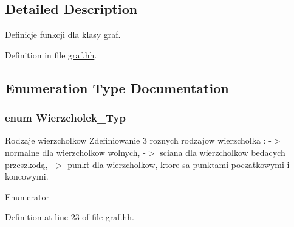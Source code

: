 \subsection{Detailed Description}
Definicje funkcji dla klasy graf. 

Definition in file \hyperlink{graf_8hh_source}{graf.\-hh}.



\subsection{Enumeration Type Documentation}
\hypertarget{graf_8hh_af54d448689b4613c3715929ca2a914a2}{
\subsubsection[{Wierzcholek\-\_\-\-Typ}]{\setlength{\rightskip}{0pt plus 5cm}enum {\bf Wierzcholek\-\_\-\-Typ}}}\label{graf_8hh_af54d448689b4613c3715929ca2a914a2}


Rodzaje wierzcholkow Zdefiniowanie 3 roznych rodzajow wierzcholka \-: -\/$>$ normalne dla wierzcholkow wolnych, -\/$>$ sciana dla wierzcholkow bedacych przeszkodą, -\/$>$ punkt dla wierzcholkow, ktore sa punktami poczatkowymi i koncowymi. 

\begin{Desc}
\item[Enumerator]\par
\begin{description}
\item[{\em 
\hypertarget{graf_8hh_af54d448689b4613c3715929ca2a914a2a846f623e19814cffb78d5ef92e77f7a3}{normalne}\label{graf_8hh_af54d448689b4613c3715929ca2a914a2a846f623e19814cffb78d5ef92e77f7a3}
}]\item[{\em 
\hypertarget{graf_8hh_af54d448689b4613c3715929ca2a914a2adb5535e159eca8e4dc5aafad57d8a4ba}{sciana}\label{graf_8hh_af54d448689b4613c3715929ca2a914a2adb5535e159eca8e4dc5aafad57d8a4ba}
}]\item[{\em 
\hypertarget{graf_8hh_af54d448689b4613c3715929ca2a914a2aeae5b57b7024c23312af9137b42aa6b1}{punkt}\label{graf_8hh_af54d448689b4613c3715929ca2a914a2aeae5b57b7024c23312af9137b42aa6b1}
}]\end{description}
\end{Desc}


Definition at line 23 of file graf.\-hh.

